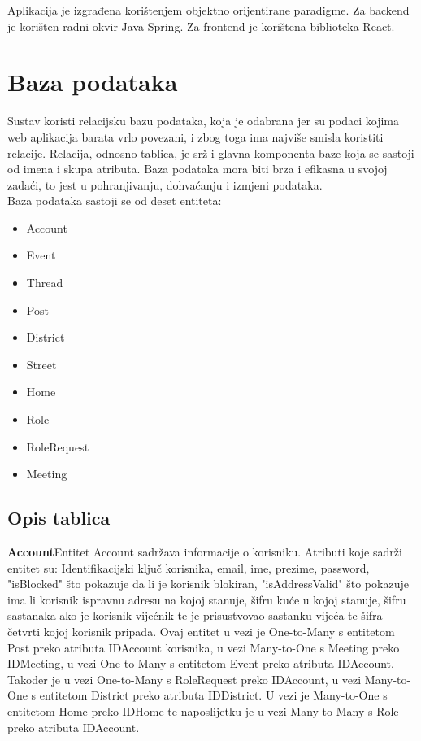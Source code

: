 		Aplikacija je izgrađena korištenjem objektno orijentirane paradigme. Za backend je korišten radni okvir Java Spring. Za frontend je korištena biblioteka React.

				
		\section{Baza podataka}
						
		
Sustav koristi relacijsku bazu podataka, koja je odabrana jer su podaci kojima web aplikacija barata vrlo povezani, i zbog toga ima najviše smisla koristiti relacije. Relacija, odnosno tablica, je srž i glavna komponenta baze koja se sastoji od imena i skupa atributa. Baza podataka mora biti brza i efikasna u svojoj zadaći, to jest u pohranjivanju, dohvaćanju i izmjeni podataka.\\
Baza podataka sastoji se od deset entiteta:
\begin{multicols}{3}

\begin{itemize}
\item Account
\item Event
\item Thread
\item Post

\end{itemize}

\columnbreak

\begin{itemize}
\item District
\item Street
\item Home
\item Role
\end{itemize}

\begin{itemize}
\item RoleRequest
\item Meeting
\end{itemize}
\end{multicols}
		
			\subsection{Opis tablica}
			
				
	\textbf{\large Account}\quad\quad Entitet Account sadržava informacije o korisniku.
				Atributi koje sadrži entitet su: Identifikacijski ključ korisnika, email, ime, prezime, password, "isBlocked" što pokazuje da li je korisnik blokiran, "isAddressValid" što pokazuje ima li korisnik ispravnu adresu na kojoj stanuje, šifru kuće u kojoj stanuje, šifru sastanaka ako je korisnik vijećnik te je prisustvovao sastanku vijeća te šifra četvrti kojoj korisnik pripada. Ovaj entitet u vezi je One-to-Many s entitetom Post preko atributa IDAccount korisnika, u vezi Many-to-One s Meeting preko IDMeeting, u vezi One-to-Many s entitetom Event preko atributa IDAccount. Također je u vezi One-to-Many s RoleRequest preko IDAccount, u vezi Many-to-One s entitetom District preko atributa IDDistrict. U vezi je Many-to-One s entitetom Home preko IDHome te naposlijetku je u vezi Many-to-Many s Role preko atributa IDAccount.
				
